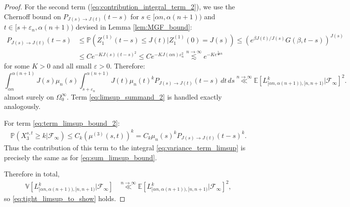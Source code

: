 \documentclass{article}
\numberwithin{equation}{section}
\newcommand{\lsimas}[2]{\overset{{#1}\to {#2}}{\lesssim}}
\newcommand{\llas}[2]{\overset{{#1}\to {#2}}{\ll}}
\begin{document}
\begin{proof}
  For the second term (\ref{eq:contribution_integral_term_2}), we use the Chernoff bound on $P_{J(s)\to J(t)}(t-s)$ for $s\in [\alpha n,\alpha(n+1))$ and $t\in [s+\varepsilon_n, \alpha(n+1))$ devised in Lemma \ref{lem:MGF_bound}:
  \begin{align*}
    P_{J(s)\to J(t)}(t-s)&\leq \mathbb{P}(Z_1^{(1)}(t-s)\leq J(t)|Z_1^{(1)}(0)=J(s))\leq\left(e^{\beta J(t)/J(s)}G(\beta,t-s)\right)^{J(s)}\\
    &\leq C e^{-KJ(s)(t-s)^2}\leq Ce^{-KJ(\alpha n)\varepsilon_n^2}\lsimas{n}{\infty} e^{-Ke^{\frac{\lambda_0}{8}n}}
  \end{align*}
  for some $K>0$ and all small $\varepsilon>0$. Therefore:
  \[
  \int_{\alpha n}^{\alpha(n+1)}J(s)\mu_n(s)\int_{s+\varepsilon_n}^{\alpha(n+1)}J(t)\mu_n(t)^kP_{J(s)\to J(t)}(t-s)\,dt\,ds\llas{n}{\infty} \mathbb{E}\left[L_{[\alpha n,\alpha (n+1)),[n,n+1)}^{k}|\mathcal{F}_\infty\right]^2.
  \]
almost surely on $\Omega_0^\infty$. Term \ref{eq:limsup_summand_2} is handled exactly analogously.

  For term \ref{eq:term_limsup_bound_2}:
  \begin{align*}
    \mathbb{P}(X_{3}^{s,t}\geq k|\mathcal{F}_\infty)\leq C_k(\mu^{(3)}(s,t))^k=C_k\mu_n(s)^kP_{J(s)\to J(t)}(t-s)^k.
  \end{align*}
  Thus the contribution of this term to the integral \ref{eq:variance_term_limsup} is precisely the same as for \ref{eq:sum_limsup_bound}.

  Therefore in total,
  \begin{align*}
    \mathbb{V}\left[L_{[\alpha n,\alpha (n+1)),[n,n+1)}^k|\mathcal{F}_\infty\right]&\llas{n}{\infty}\mathbb{E}[L_{[\alpha n,\alpha (n+1)),[n,n+1)}^k|\mathcal{F}_\infty]^2,
  \end{align*}
  so \ref{eq:tight_limsup_to_show} holds.
\end{proof}
\end{document}
